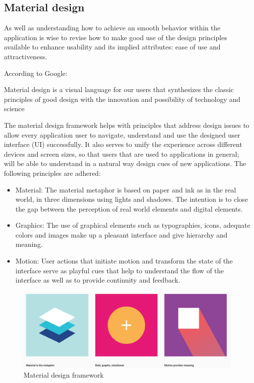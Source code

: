 \subsection{Material design}
As well as understanding how to achieve an smooth behavior within the application is wise to revise how to make good use of the design principles available to enhance usability and its implied attributes: ease of use and attractiveness. 

According to Google: \begin{displayquote}Material design is  a visual language for our users that synthesizes the classic principles of good design with the innovation and possibility of technology and science \end{displayquote} 

The material design framework helps with principles that address design issues to allow every application user to navigate, understand and use the designed user interface (UI) successfully. It also serves to unify the experience across different devices and screen sizes, so that users that are used to applications in general; will be able to understand in a natural way design cues of new applications. The following principles are adhered:   

\begin{itemize}
	\item Material: The material metaphor is based on paper and ink as in the real world, in three dimensions using lights and shadows. The intention is to close the gap between the perception of real world elements and digital elements. 
    \item Graphics: The use of graphical elements such as typographies, icons, adequate colors and images make up a pleasant interface and give hierarchy and meaning. 
    \item Motion: User actions that initiate motion and transform the state of the interface serve as playful cues that help to understand the flow of the interface as well as to provide continuity and feedback. 
\end{itemize}


\begin{figure}[H]
\begin{adjustbox}{width=1\textwidth,center=\textwidth}
  \centering
  \includegraphics[scale=1]{images/material_google.png}
\end{adjustbox}
  \caption[Material design framework]{Material design framework \footnotemark}
  \label{fig:android_material_design}
\end{figure}


